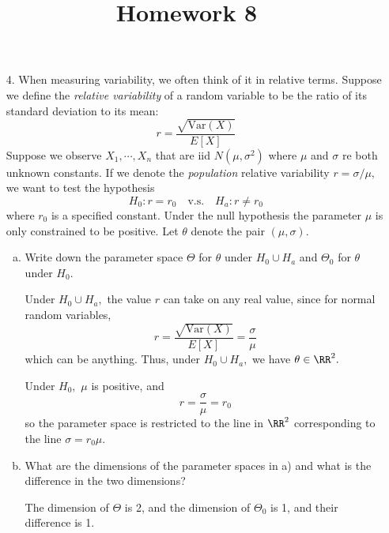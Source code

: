 \documentclass{article}
\newcommand{\var}{\mathrm{Var}}
\begin{document}
\title{Homework 8}
\maketitle
\thispagestyle{fancy}

\begin{itemize}
	\item[4.] When measuring variability, we often think of it in relative terms. Suppose we define the \textit{relative variability} of a random variable to be the ratio of its standard deviation to its mean: \[r=\frac{\sqrt{\var(X)}}{E[X]}\] Suppose we observe $X_1, \cdots, X_n$ that are iid $N(\mu, \sigma^2)$ where $\mu$ and $\sigma$ re both unknown constants. If we denote the \textit{population} relative variability $r=\sigma/\mu,$ we want to test the hypothesis \[H_0:r=r_0\quad \text{v.s.}\quad H_a: r\neq r_0\] where $r_0$ is a specified constant. Under the null hypothesis the parameter $\mu$ is only constrained to be positive. Let $\theta$ denote the pair $(\mu, \sigma).$
		\begin{enumerate}[(a)]
			\item Write down the parameter space $\Theta$ for $\theta$ under $H_0\cup H_a$ and $\Theta_0$ for $\theta$ under $H_0.$
				\begin{soln}
					Under $H_0\cup H_a,$ the value $r$ can take on any real value, since for normal random variables, \[r=\frac{\sqrt{\var(X)}}{E[X]}=\frac{\sigma}{\mu}\] which can be anything. Thus, under $H_0\cup H_a,$ we have $\theta\in \RR^2.$ 

					Under $H_0,$ $\mu$ is positive, and \[r=\frac{\sigma}{\mu}=r_0\] so the parameter space is restricted to the line in $\RR^2$ corresponding to the line $\sigma=r_0 \mu.$
				\end{soln}

			\item What are the dimensions of the parameter spaces in a) and what is the difference in the two dimensions?
				\begin{answer*}
					The dimension of $\Theta$ is 2, and the dimension of $\Theta_0$ is 1, and their difference is 1.
				\end{answer*}


\end{enumerate}
\end{itemize}
\end{document}
